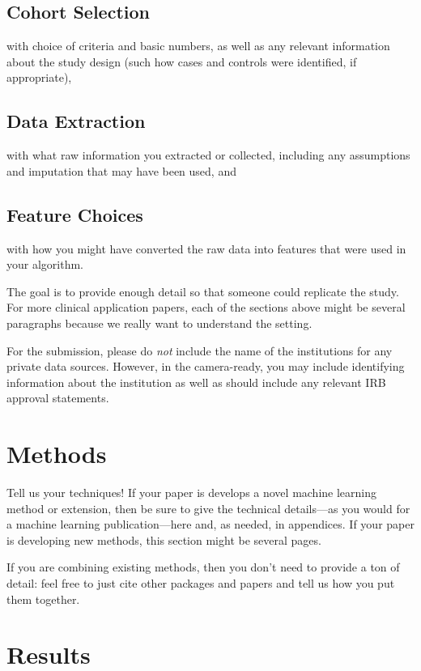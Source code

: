\documentclass[twoside,11pt]{article}
\begin{document}
\subsection{Cohort Selection} 
with choice of criteria and basic numbers, as well as any relevant
information about the study design (such how cases and controls were
identified, if appropriate), 

\subsection{Data Extraction} 
with what raw information you extracted or collected, including any
assumptions and imputation that may have been used, and 

\subsection{Feature Choices} 
with how you might have converted the raw data into features that were
used in your algorithm. 

The goal is to provide enough detail so that someone could replicate
the study.  For more clinical application papers, each of the sections
above might be several paragraphs because we really want to understand
the setting.  

For the submission, please do \emph{not} include the name of the
institutions for any private data sources.  However, in the
camera-ready, you may include identifying information about the
institution as well as should include any relevant IRB approval
statements.  

\section{Methods}

Tell us your techniques!  If your paper is develops a novel machine
learning method or extension, then be sure to give the technical
details---as you would for a machine learning publication---here and,
as needed, in appendices.  If your paper is developing new methods,
this section might be several pages.  

If you are combining existing methods, then you don't need to provide
a ton of detail: feel free to just cite other packages and papers and
tell us how you put them together.  

\section{Results} 
\end{document}
